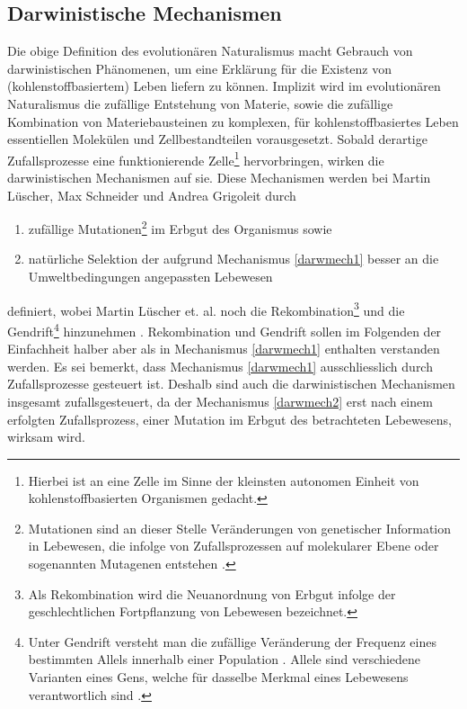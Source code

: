 \documentclass[a4paper,11pt]{article}
\numberwithin{equation}{section}
\begin{document}
\subsection{Darwinistische Mechanismen}
Die obige Definition des evolutionären Naturalismus macht Gebrauch von darwinistischen Phänomenen, um eine Erklärung für die Existenz von (kohlenstoffbasiertem) Leben liefern zu können. Implizit wird im evolutionären Naturalismus die zufällige Entstehung von Materie, sowie die zufällige Kombination von Materiebausteinen zu komplexen, für kohlenstoffbasiertes Leben essentiellen Molekülen und Zellbestandteilen vorausgesetzt. Sobald derartige Zufallsprozesse eine funktionierende Zelle\footnote{Hierbei ist an eine Zelle im Sinne der kleinsten autonomen Einheit von kohlenstoffbasierten Organismen gedacht.} hervorbringen, wirken die darwinistischen Mechanismen auf sie. Diese Mechanismen werden bei Martin Lüscher, Max Schneider und Andrea Grigoleit durch \begin{enumerate}
\item zufällige Mutationen\footnote{Mutationen sind an dieser Stelle Veränderungen von genetischer Information in Lebewesen, die infolge von Zufallsprozessen auf molekularer Ebene oder sogenannten Mutagenen entstehen \cite[S. 73]{Luscher.}.} im Erbgut des Organismus sowie \label{darwmech1}
\item natürliche Selektion der aufgrund Mechanismus \ref{darwmech1} besser an die Umweltbedingungen angepassten Lebewesen \label{darwmech2}
\end{enumerate}  definiert, wobei Martin Lüscher et. al. noch die Rekombination\footnote{Als Rekombination wird die Neuanordnung von Erbgut infolge der geschlechtlichen Fortpflanzung von Lebewesen bezeichnet\cite[S. 76]{Luscher.}.} und die Gendrift\footnote{Unter Gendrift versteht man die zufällige Veränderung der Frequenz eines bestimmten Allels innerhalb einer Population \cite[S. 92]{Luscher.}. Allele sind verschiedene Varianten eines Gens, welche für dasselbe Merkmal eines Lebewesens verantwortlich sind \cite[S. 193]{Luscher.}.} hinzunehmen \cite[S. 94]{Luscher.}. Rekombination und Gendrift sollen im Folgenden der Einfachheit halber aber als in Mechanismus \ref{darwmech1} enthalten verstanden werden.
Es sei bemerkt, dass Mechanismus \ref{darwmech1} ausschliesslich durch Zufallsprozesse gesteuert ist. Deshalb sind auch die darwinistischen Mechanismen insgesamt zufallsgesteuert, da der Mechanismus \ref{darwmech2} erst nach einem erfolgten Zufallsprozess, einer Mutation im Erbgut des betrachteten Lebewesens, wirksam wird.
\end{document}
